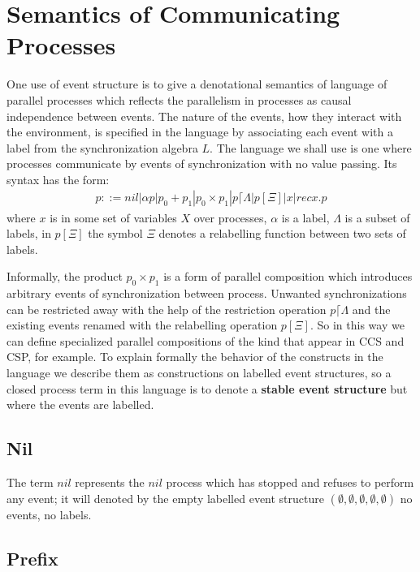 \documentclass{article}
\begin{document}
\section{Semantics of Communicating Processes}
One use of event structure is to give a denotational semantics of language of parallel
processes which reflects the parallelism in processes as causal independence between events.
The nature of the events, how they interact with the environment, 
is specified in the language by associating each event with a label from the synchronization 
algebra $L$.
The language we shall use is one where processes communicate by events of synchronization
with no value passing.
Its syntax has the form:
\begin{align*}
    p ::= nil | \alpha p | p_0 + p_1 | p_0 \times p_1 | p\lceil \Lambda | p[\Xi] | x | recx.p
\end{align*}
where $x$ is in some set of variables $X$ over processes, $\alpha$ is a label,
$\Lambda$ is a subset of labels, in $p[\Xi]$ the symbol $\Xi$ denotes a relabelling function between 
two sets of labels.

Informally, the product $p_0 \times p_1$ is a form of parallel composition which introduces 
arbitrary events of synchronization between process. 
Unwanted synchronizations can be restricted away with the help of the restriction operation
$p\lceil \Lambda$ and the existing events renamed with the relabelling operation $p[\Xi]$.
So in this way we can define specialized parallel compositions of the kind that appear in 
CCS and CSP, for example.
To explain formally the behavior of the constructs in the language we describe them as
constructions on labelled event structures, so a closed process term in this language is to 
denote a \textbf{stable event structure} but where the events are labelled.

\subsection{Nil}
The term $nil$ represents the $nil$ process which has stopped and refuses to perform any event;
it will denoted by the empty labelled event structure $(\emptyset,\emptyset,\emptyset,\emptyset,\emptyset)$
no events, no labels.

\subsection{Prefix}
\end{document}
